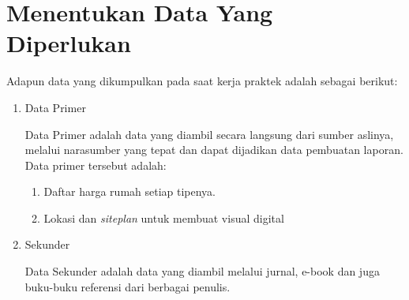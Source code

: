 \section{Menentukan Data Yang Diperlukan}
\par Adapun data yang dikumpulkan pada saat kerja praktek adalah sebagai berikut:

\begin{enumerate} [label=\alph*.]
\item Data Primer
\par Data Primer adalah data yang diambil secara langsung dari sumber aslinya, melalui narasumber yang tepat dan dapat dijadikan data pembuatan laporan. Data primer tersebut adalah:
	\begin {enumerate}
	\item Daftar harga rumah setiap tipenya.
	\item Lokasi dan \textit{siteplan} untuk membuat visual digital
	\end{enumerate}
\item Sekunder
\par Data Sekunder adalah data yang diambil melalui jurnal, e-book dan juga buku-buku referensi dari berbagai penulis.
\end{enumerate}
